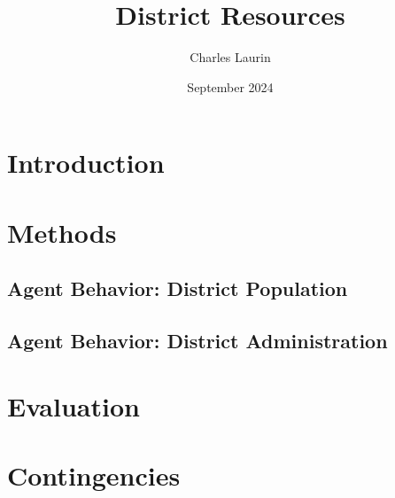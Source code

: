 \documentclass{article}
\title{District Resources}
\author{Charles Laurin}
\date{September 2024}
\begin{document}
\section*{Introduction}

\section*{Methods}
\subsection*{Agent Behavior: District Population}
\subsection*{Agent Behavior: District Administration}
\section*{Evaluation}

\section*{Contingencies}
\end{document}
